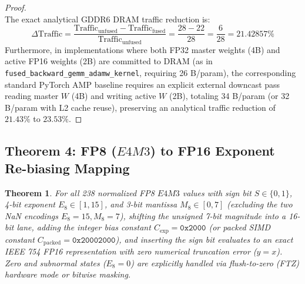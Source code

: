 \documentclass[10pt,twocolumn,letterpaper]{article}
\newtheorem{theorem}{Theorem}
\begin{document}
\begin{proof}
\begin{equation}
\end{equation}
The exact analytical GDDR6 DRAM traffic reduction is:
\begin{equation}
\Delta \text{Traffic} = \frac{\text{Traffic}_{\text{unfused}} - \text{Traffic}_{\text{fused}}}{\text{Traffic}_{\text{unfused}}} = \frac{28 - 22}{28} = \frac{6}{28} = 21.42857\%
\end{equation}
Furthermore, in implementations where both FP32 master weights (4B) and active FP16 weights (2B) are committed to DRAM (as in \texttt{fused\_backward\_gemm\_adamw\_kernel}, requiring 26 B/param), the corresponding standard PyTorch AMP baseline requires an explicit external downcast pass reading master $W$ (4B) and writing active $W$ (2B), totaling 34 B/param (or 32 B/param with L2 cache reuse), preserving an analytical traffic reduction of $21.43\%$ to $23.53\%$.
\end{proof}

\subsection{Theorem 4: FP8 ($E4M3$) to FP16 Exponent Re-biasing Mapping}
\begin{theorem}
For all 238 normalized FP8 $E4M3$ values with sign bit $S \in \{0, 1\}$, 4-bit exponent $E_8 \in [1, 15]$, and 3-bit mantissa $M_8 \in [0, 7]$ (excluding the two NaN encodings $E_8=15, M_8=7$), shifting the unsigned 7-bit magnitude into a 16-bit lane, adding the integer bias constant $C_{\text{exp}} = \texttt{0x2000}$ (or packed SIMD constant $C_{\text{packed}} = \texttt{0x20002000}$), and inserting the sign bit evaluates to an exact IEEE 754 FP16 representation with zero numerical truncation error ($y = x$). Zero and subnormal states ($E_8 = 0$) are explicitly handled via flush-to-zero (FTZ) hardware mode or bitwise masking.
\end{theorem}
\end{document}
